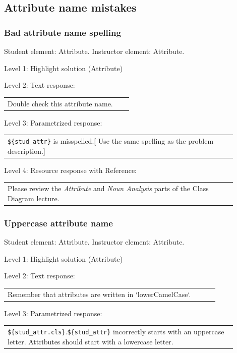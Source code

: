\subsection{Attribute name mistakes}

\subsubsection{Bad attribute name spelling}

Student element: Attribute. Instructor element: Attribute. \medskip

\noindent Level 1: Highlight solution (Attribute) \medskip

\noindent Level 2: Text response: \medskip

\begin{tabular}{|p{0.9\linewidth}}
Double check this attribute name.
\end{tabular} \medskip

\noindent Level 3: Parametrized response: \medskip

\begin{tabular}{|p{0.9\linewidth}}
\verb|${stud_attr}| is misspelled.[ Use the same spelling as the problem description.]
\end{tabular} \medskip

\noindent Level 4: Resource response with Reference: \medskip

\begin{tabular}{|p{0.9\linewidth}}
Please review the \textit{Attribute} and \textit{Noun Analysis} parts of the Class Diagram lecture.
\end{tabular} \medskip


\subsubsection{Uppercase attribute name}

Student element: Attribute. Instructor element: Attribute. \medskip

\noindent Level 1: Highlight solution (Attribute) \medskip

\noindent Level 2: Text response: \medskip

\begin{tabular}{|p{0.9\linewidth}}
Remember that attributes are written in `lowerCamelCase`.
\end{tabular} \medskip

\noindent Level 3: Parametrized response: \medskip

\begin{tabular}{|p{0.9\linewidth}}
\verb|${stud_attr.cls}|.\verb|${stud_attr}| incorrectly starts with an uppercase letter. Attributes should start with a lowercase letter.
\end{tabular} \medskip

